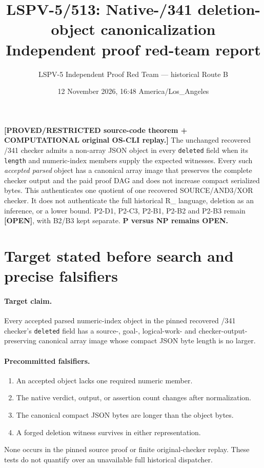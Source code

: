 \documentclass[11pt]{article}
\title{LSPV-5/513: Native-/341 deletion-object canonicalization\\
Independent proof red-team report}
\author{LSPV-5 Independent Proof Red Team --- historical Route B}
\date{12 November 2026, 16:48 America/Los\_Angeles}
\newcommand{\status}[1]{\textbf{[#1]}}
\newcommand{\Rmix}{R_{\mathrm{mix341}}}
\begin{document}
\maketitle

\noindent\status{PROVED/RESTRICTED source-code theorem + COMPUTATIONAL original OS-CLI replay.}
The unchanged recovered /341 checker admits a non-array JSON object in every
\texttt{deleted} field when its \texttt{length} and numeric-index members supply
the expected witnesses.  Every such \emph{accepted parsed} object has a
canonical array image that preserves the complete checker output and the paid
proof DAG and does not increase compact serialized bytes.  This authenticates
one quotient of one recovered SOURCE/AND3/XOR checker.  It does not authenticate
the full historical \Rmix{} language, deletion as an inference, or a lower
bound.  P2-D1, P2-C3, P2-B1, P2-B2 and P2-B3 remain \status{OPEN}, with B2/B3
kept separate.  \textbf{P versus NP remains OPEN.}

\section{Target stated before search and precise falsifiers}

\paragraph{Target claim.}
Every accepted parsed numeric-index object in the pinned recovered /341
checker's \texttt{deleted} field has a source-, goal-, logical-work- and
checker-output-preserving canonical array image whose compact JSON byte length
is no larger.

\paragraph{Precommitted falsifiers.}
\begin{enumerate}
\item An accepted object lacks one required numeric member.
\item The native verdict, output, or assertion count changes after normalization.
\item The canonical compact JSON bytes are longer than the object bytes.
\item A forged deletion witness survives in either representation.
\end{enumerate}
None occurs in the pinned source proof or finite original-checker replay.  These
tests do not quantify over an unavailable full historical dispatcher.
\end{document}
